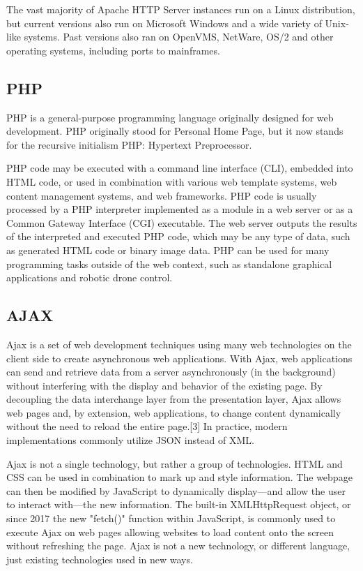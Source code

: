 \documentclass[12pt]{article}
\begin{document}
The vast majority of Apache HTTP Server instances run on a Linux distribution, but current versions also run on Microsoft Windows and a wide variety of Unix-like systems. Past versions also ran on OpenVMS, NetWare, OS/2 and other operating systems, including ports to mainframes.

\subsection{PHP}
PHP is a general-purpose programming language originally designed for web development. PHP originally stood for Personal Home Page,
but it now stands for the recursive initialism PHP: Hypertext Preprocessor.

PHP code may be executed with a command line interface (CLI), embedded into HTML code, or used in combination with various web template systems, web content management systems, and web frameworks. PHP code is usually processed by a PHP interpreter implemented as a module in a web server or as a Common Gateway Interface (CGI) executable. The web server outputs the results of the interpreted and executed PHP code, which may be any type of data, such as generated HTML code or binary image data. PHP can be used for many programming tasks outside of the web context, such as standalone graphical applications and robotic drone control.

\subsection{AJAX}
Ajax is a set of web development techniques using many web technologies on the client side to create asynchronous web applications. With Ajax, web applications can send and retrieve data from a server asynchronously (in the background) without interfering with the display and behavior of the existing page. By decoupling the data interchange layer from the presentation layer, Ajax allows web pages and, by extension, web applications, to change content dynamically without the need to reload the entire page.[3] In practice, modern implementations commonly utilize JSON instead of XML.

Ajax is not a single technology, but rather a group of technologies. HTML and CSS can be used in combination to mark up and style information. The webpage can then be modified by JavaScript to dynamically display—and allow the user to interact with—the new information. The built-in XMLHttpRequest object, or since 2017 the new "fetch()" function within JavaScript, is commonly used to execute Ajax on web pages allowing websites to load content onto the screen without refreshing the page. Ajax is not a new technology, or different language, just existing technologies used in new ways.
\end{document}
